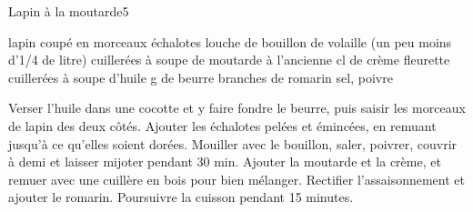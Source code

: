 \begin{recette}{Lapin à la moutarde}{5}{}{}
\begin{ingredients}[6 pers.]
 lapin coupé en morceaux
 échalotes
 louche de bouillon de volaille (un peu moins d'1/4 de litre)
 cuillerées à soupe de moutarde à l'ancienne
 cl de crème fleurette
 cuillerées à soupe d'huile
 g de beurre
 branches de romarin
\ingredient sel, poivre
\end{ingredients}

\begin{preparation}
\etape Verser l'huile dans une cocotte et y faire fondre le beurre, puis saisir les morceaux de lapin des deux côtés.
\etape Ajouter les échalotes pelées et émincées, en remuant jusqu'à ce qu'elles soient dorées.
\etape Mouiller avec le bouillon, saler, poivrer, couvrir à demi et laisser mijoter pendant 30 min.
\etape Ajouter la moutarde et la crème, et remuer avec une cuillère en bois pour bien mélanger. Rectifier l'assaisonnement et ajouter le romarin.
\etape Poursuivre la cuisson pendant 15 minutes.
\end{preparation}


\end{recette}

